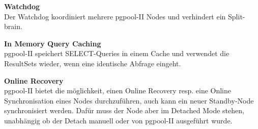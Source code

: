 \begin{flushleft}
    \textbf{Watchdog}\\
    Der Watchdog koordiniert mehrere pgpool-II Nodes und verhindert ein Split-brain.
\end{flushleft}
\begin{flushleft}
    \textbf{In Memory Query Caching}\\
    pgpool-II speichert SELECT-Queries in einem Cache und verwendet die ResultSets wieder, wenn eine identische Abfrage eingeht.
\end{flushleft}
\begin{flushleft}
    \textbf{Online Recovery}\\
    pgpool-II bietet die möglichkeit, einen Online Recovery resp.
    eine Online Synchronisation eines Nodes durchzuführen, auch kann ein neuer Standby-Node synchronisiert werden.
    Dafür muss der Node aber im Detached Mode stehen, unabhängig ob der Detach manuell oder von pgpool-II ausgeführt wurde.
\end{flushleft}
